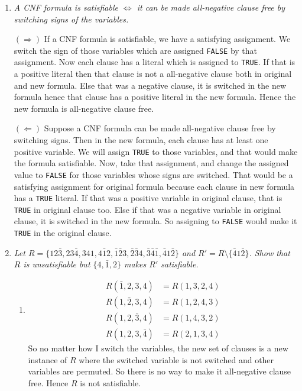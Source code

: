\documentclass[twoside]{article}
\begin{document}
\begin{enumerate}
    \item \textit{A CNF formula is satisfiable $\Leftrightarrow$ it can be made all-negative clause free by switching signs of the variables.}

          $(\Rightarrow)$ If a CNF formula is satisfiable, we have a satisfying assignment. We switch the sign of those variables which are assigned \texttt{FALSE} by that assignment. Now each clause has a literal which is assigned to \texttt{TRUE}. If that is a positive literal then that clause is not a all-negative clause both in original and new formula. Else that was a negative clause, it is switched in the new formula hence that clause has a positive literal in the new formula. Hence the new formula is all-negative clause free.

          $(\Leftarrow)$ Suppose a CNF formula can be made all-negative clause free by switching signs. Then in the new formula, each clause has at least one positive variable. We will assign \texttt{TRUE} to those variables, and that would make the formula satisfiable. Now, take that assignment, and change the assigned value to \texttt{FALSE} for those variables whose signs are switched. That would be a satisfying assignment for original formula because each clause in new formula has a \texttt{TRUE} literal. If that was a positive variable in original clause, that is \texttt{TRUE} in original clause too. Else if that was a negative variable in original clause, it is switched in the new formula. So assigning to \texttt{FALSE} would make it \texttt{TRUE} in the original clause.

    \item \textit{Let $R = \{12\bar3, 23\bar4, 341, 4\bar12, \bar1\bar23, \bar2\bar34, \bar3\bar4\bar1, \bar41\bar2\}$ and $R' = R \setminus \{\bar41\bar2\}$. Show that $R$ is unsatisfiable but $\{4, \bar1, 2\}$ makes $R'$ satisfiable.}
          \begin{enumerate}
            \item
                  \begin{align*}
                    R(\bar1, 2, 3, 4) & = R(1, 3, 2, 4) \\
                    R(1, \bar2, 3, 4) & = R(1, 2, 4, 3) \\
                    R(1, 2, \bar3, 4) & = R(1, 4, 3, 2) \\
                    R(1, 2, 3, \bar4) & = R(2, 1, 3, 4)
                  \end{align*}
                  So no matter how I switch the variables, the new set of clauses is a new instance of $R$ where the switched variable is not switched and other variables are permuted. So there is no way to make it all-negative clause free. Hence $R$ is not satisfiable.


\end{enumerate}
\end{enumerate}
\end{document}
